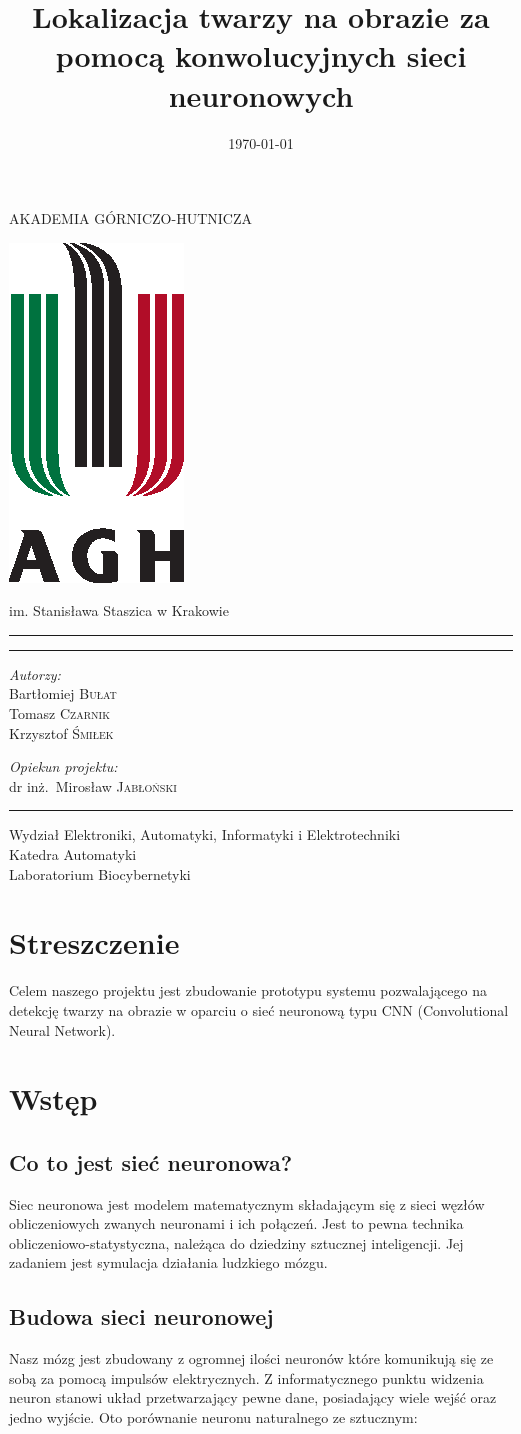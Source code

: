 \documentclass[11pt,a4paper]{article}
\title{Lokalizacja twarzy na obrazie za pomocą konwolucyjnych sieci neuronowych}
\date{\today}
\makeatletter
\renewcommand{\maketitle}{
\begin{titlepage}
\begin{center}

\LARGE{AKADEMIA GÓRNICZO-HUTNICZA}

\vspace*{1cm}
\includegraphics[scale=1.8]{agh.eps}
\vspace*{1cm}

\LARGE{im. Stanisława Staszica w Krakowie}

\rule{\textwidth}{0.4mm}
\LARGE \textsc{\@title}
\rule{\textwidth}{0.4mm}

\vspace*{5mm}

\begin{minipage}{0.4\textwidth}
\begin{flushleft} \large
\emph{Autorzy:}\\
Bartłomiej \textsc{Bułat}\\
Tomasz \textsc{Czarnik}\\
Krzysztof \textsc{Śmiłek}\\
\end{flushleft}
\end{minipage}
\begin{minipage}{0.4\textwidth}
\begin{flushright} \large
\emph{Opiekun projektu:} \\
dr inż.~Mirosław \textsc{Jabłoński}
\end{flushright}
\end{minipage}
\vfill
\vspace*{\stretch{8}}
\rule{\textwidth}{0.4mm}

\large{Wydział Elektroniki, Automatyki, Informatyki i Elektrotechniki}\\
\large{Katedra Automatyki}\\
\large{Laboratorium Biocybernetyki}\\
\vspace*{\stretch{7}}
\@date

\end{center}

\end{titlepage}
}
\makeatother
\begin{document}
\maketitle
\printindex


\section{Streszczenie}

Celem naszego projektu jest zbudowanie prototypu systemu pozwalającego na detekcję twarzy na obrazie 
w oparciu o sieć neuronową typu CNN (Convolutional Neural Network).
\section{Wstęp}

\subsection{Co to jest sieć neuronowa?}
Siec neuronowa jest modelem matematycznym składającym się z sieci węzłów obliczeniowych zwanych neuronami
 i ich połączeń. Jest to pewna technika obliczeniowo-statystyczna, należąca do dziedziny sztucznej inteligencji. 
Jej zadaniem jest symulacja działania ludzkiego mózgu. 

\subsection{Budowa sieci neuronowej }
Nasz mózg jest zbudowany z ogromnej ilości neuronów które komunikują się ze sobą za pomocą impulsów elektrycznych.
 Z informatycznego punktu widzenia neuron stanowi układ przetwarzający pewne dane, posiadający wiele wejść
 oraz jedno wyjście. Oto porównanie neuronu naturalnego ze sztucznym:
\end{document}
